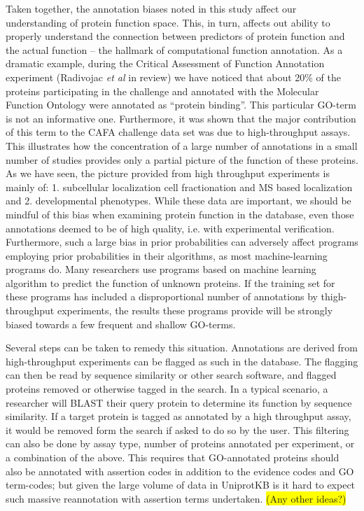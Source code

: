 \documentclass[12pt]{article}
\newcommand{\hilite}[1]{\colorbox{yellow}{#1}}
\begin{document}
Taken together, the annotation biases noted in this study affect our understanding of protein
function space. This, in turn, affects out ability to properly understand the connection between
predictors of protein function and the actual function -- the hallmark of computational function
annotation. As a dramatic example, during the Critical Assessment of Function Annotation
experiment (Radivojac \textit{et al} in review) we have noticed that about 20\% of the proteins
participating in the challenge and annotated with the Molecular Function Ontology were annotated
as ``protein binding''. This particular GO-term is not an informative one. Furthermore, it was
shown that the major contribution of this term to the CAFA challenge data set was due to
high-throughput assays. This illustrates how the concentration of a large number of annotations in
a small number of studies provides only a partial picture of the function of these proteins. As we
have seen, the picture provided from high throughput experiments is mainly of: 1. subcellular
localization cell fractionation and MS based localization and 2. developmental phenotypes. While
these data are important, we should be mindful of this bias when examining protein function in the
database, even those annotations deemed to be of high quality, i.e. with experimental
verification. Furthermore, such a large bias in prior probabilities can adversely affect programs
employing prior probabilities in their algorithms, as most machine-learning programs do. Many
researchers use programs based on machine learning algorithm to predict the function of unknown
proteins. If the training set for these programs has included a disproportional number of
annotations by thigh-throughput experiments, the results these programs provide will be strongly
biased towards a few frequent and shallow GO-terms.

Several steps can be taken to remedy this situation. Annotations are derived from
high-throughput experiments can be flagged as such in the database. The flagging can then be
read by sequence similarity or other search software, and flagged proteins removed or
otherwise tagged in the search.  In a typical scenario, a researcher will BLAST their query
protein to determine its function by sequence similarity. If a target protein is tagged as
annotated by a high throughput assay, it would be removed form the search if asked to do so
by the user. This filtering can also be done by assay type, number of proteins annotated per
experiment, or a combination of the above. This requires that GO-annotated proteins should
also be annotated with assertion codes in addition to the evidence codes and GO term-codes;
but given the large volume of data in UniprotKB is it hard to expect such massive
reannotation with assertion terms undertaken. \hilite{(Any other ideas?)}
\end{document}
